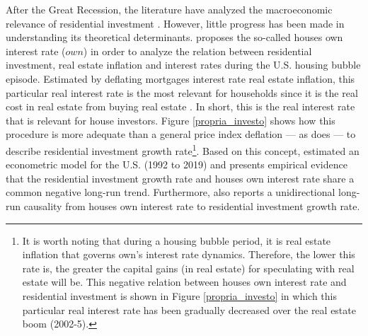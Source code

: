 \documentclass[11pt]{article}
\begin{document}
After the Great Recession, the literature have analyzed the macroeconomic relevance of residential investment \cites{leamer_housing_2015}{fiebiger_semi-autonomous_2018}.
However, little progress has been made in understanding its theoretical determinants.
\textcite{teixeira_crescimento_2015} proposes the so-called houses own interest rate (\(own\)) in order to analyze the relation between residential investment, real estate inflation and interest rates during the U.S. housing bubble episode.
Estimated by deflating mortgages interest rate real estate inflation, this particular real interest rate is the most relevant for households since it is the real cost in real estate from buying real estate  \cite[p.~53]{teixeira_crescimento_2015}.
In short, this is the real interest rate that is relevant for house investors.
Figure \ref{propria_investo} shows how this  procedure is more adequate than a general price index deflation --- as \textcite[p.~143--6]{fair_macroeconometric_2013} does --- to describe residential investment growth rate\footnote{It is worth noting that during a housing bubble period, it is real estate inflation that governs own's interest rate dynamics.
Therefore, the lower this rate is, the greater the capital gains (in real estate) for speculating with real estate will be. This negative relation between houses own interest rate and residential investment is shown in Figure \ref{propria_investo} in which this particular real interest rate has been gradually decreased over the real estate boom (2002-5).}.
Based on this concept, \textcite{petrini_demanda_2019} estimated an econometric model for the U.S. (1992 to 2019) and presents empirical evidence that the residential investment growth rate and houses own interest rate share a common negative long-run trend.
Furthermore, \textcite{petrini_demanda_2019} also reports a unidirectional long-run causality from houses own interest rate to residential investment growth rate.
\end{document}
